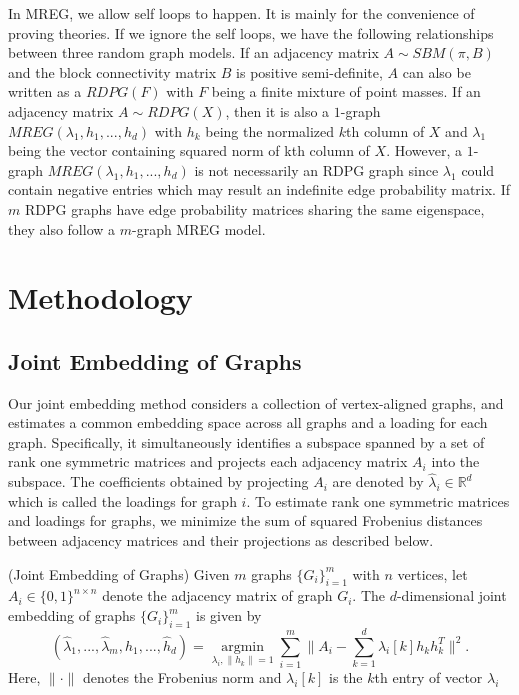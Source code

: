 \documentclass[10pt,journal,compsoc]{IEEEtran}
\newenvironment{definition}[1][Definition]{\begin{trivlist}
		\item[\hskip \labelsep {\bfseries #1}]}{\end{trivlist}}
\begin{document}
\noindent In MREG, we allow self loops to happen. It is mainly for the convenience of proving theories. If we ignore the self loops, we have the following relationships between three random graph models. If an adjacency matrix $A \sim SBM(\pi,B)$ and the block connectivity matrix $B$ is positive semi-definite, $A$ can also be written as a $RDPG(F)$ with $F$ being a finite mixture of point masses. If an adjacency matrix $A \sim RDPG(X)$, then it is also a $1$-graph $MREG(\lambda_1,h_1,...,h_d)$ with $h_k$ being the normalized $k$th column of $X$ and $\lambda_1$ being the vector containing squared norm of kth column of $X$. However, a $1$-graph $MREG(\lambda_1,h_1,...,h_d)$ is not necessarily an RDPG graph since $\lambda_1$ could contain negative entries which may result an indefinite edge probability matrix. If $m$ RDPG graphs have edge probability matrices sharing the same eigenspace, they also follow a $m$-graph MREG model. 

\section{Methodology}
\subsection{Joint Embedding of Graphs}
Our joint embedding method considers a collection of vertex-aligned graphs, and estimates a common embedding space across all graphs and a loading for each graph. Specifically, it simultaneously identifies a subspace spanned by a set of rank one symmetric matrices and projects each adjacency matrix $A_i$ into the subspace. The coefficients obtained by projecting $A_i$ are denoted by $\hat{\lambda}_i \in \mathbb{R}^d$ which is called the loadings for graph $i$. To estimate rank one symmetric matrices and loadings for graphs, we minimize the sum of squared Frobenius distances between adjacency matrices and their projections as described below.
\begin{definition} (Joint Embedding of Graphs) Given $m$  graphs $\{G_i \} _{i=1}^{m}$ with $n$ vertices, let $A_i \in \{0,1\}^{n \times n }$ denote  the adjacency matrix of graph $G_i$. The $d$-dimensional joint embedding of graphs $\{G_i \} _{i=1}^{m}$ is given by
\begin{equation}\label{eq:1}
 (\hat{\lambda}_1,...,\hat{\lambda}_m,\hat{h}_1,...,\hat{h}_d) = \underset{\lambda_i,\|h_k\|=1}{\operatorname{argmin}} \sum\limits_{i=1}^{m} \| A_i- \sum\limits_{k=1}^{d} \lambda_{i}[k] h_k h_k^T \|  ^2.  
\end{equation}
Here, $\| \cdot \|$ denotes the Frobenius norm and $\lambda_{i}[k]$ is the $k$th entry of vector $\lambda_i$
\end{definition}
\end{document}

